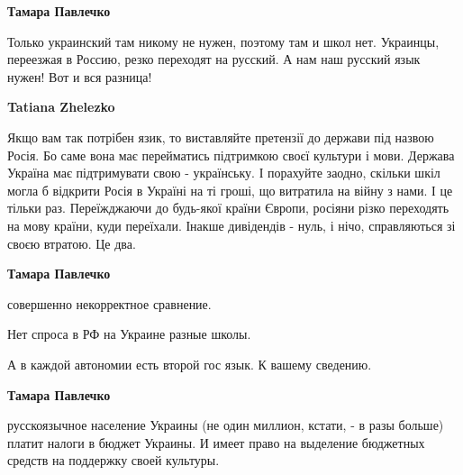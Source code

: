 \begin{itemize}
\begin{itemize}
 
\textbf{Тамара Павлечко} 

Только украинский там никому не нужен, поэтому там и школ нет. Украинцы,
переезжая в Россию, резко переходят на русский. А нам наш русский язык нужен!
Вот и вся разница!

 
\textbf{Tatiana Zhelezko} 

Якщо вам так потрібен язик, то виставляйте претензії до держави під назвою
Росія. Бо саме вона має перейматись підтримкою своєї культури і мови. Держава
Україна має підтримувати свою - українську. І порахуйте заодно, скільки шкіл
могла б відкрити Росія в Україні на ті гроші, що витратила на війну з нами. І
це тільки раз. Переїжджаючи до будь-якої країни Європи, росіяни різко
переходять на мову країни, куди переїхали. Інакше дивідендів - нуль, і нічо,
справляються зі своєю втратою. Це два.


 
\textbf{Тамара Павлечко} 

совершенно некорректное сравнение.

Нет спроса в РФ на Украине разные школы.

А в каждой автономии есть второй гос язык. К вашему сведению.

 
\textbf{Тамара Павлечко} 

русскоязычное население Украины (не один миллион, кстати, - в разы больше)
платит налоги в бюджет Украины. И имеет право на выделение бюджетных средств на
поддержку своей культуры.



\end{itemize}
\end{itemize}
